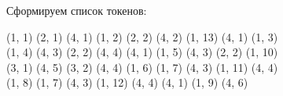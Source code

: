 \documentclass[a4paper, 14pt]{extarticle}
\begin{document}
\begin{table}[h!]
    \centering
\end{table}


Сформируем список токенов:

\begin{center}
    (1, 1) \quad (2, 1) \quad (4, 1) \quad (1, 2) \quad (2, 2) \quad (4, 2) 
    \quad (1, 13) \quad (4, 1) \quad (1, 3) \\[1em]
    
    (1, 4) \quad (4, 3) \quad (2, 2) \quad (4, 4) \quad (4, 1) \quad (1, 5) 
    \quad (4, 3) \quad (2, 2) \quad (1, 10) \\[1em]
    
    (3, 1) \quad (4, 5) \quad (3, 2) \quad (4, 4) \quad (1, 6) \quad (1, 7) 
    \quad (4, 3) \quad (1, 11) \quad (4, 4) \\[1em]
    
    (1, 8) \quad (1, 7) \quad (4, 3) \quad (1, 12) \quad (4, 4) \quad (4, 1) 
    \quad (1, 9) \quad (4, 6) \quad \hphantom{(4, 6)}
\end{center}
\end{document}

